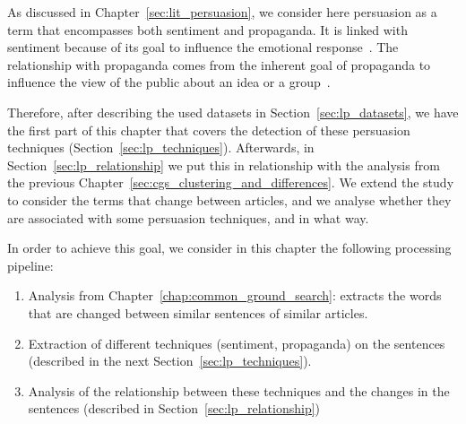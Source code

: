 As discussed in Chapter~\ref{sec:lit_persuasion}, we consider here \gls{persuasion} as a term that encompasses both \gls{sentiment} and \gls{propaganda}. %
It is linked with sentiment because of its goal to influence the emotional response~\citep{gatti2014sentiment,rocklage2018persuasion,petty2015emotion,desteno2004discrete}.
The relationship with propaganda comes from the inherent goal of propaganda to influence the view of the public about an idea or a group~\citep{bernays,jowett2018propaganda}.



Therefore, after describing the used datasets in Section~\ref{sec:lp_datasets}, we have the first part of this chapter that covers the detection of these persuasion techniques (Section~\ref{sec:lp_techniques}).
Afterwards, in Section~\ref{sec:lp_relationship} we put this in relationship with the analysis from the previous Chapter~\ref{sec:cgs_clustering_and_differences}. %
We extend the study to consider the terms that change between articles, and we analyse whether they are associated with some persuasion techniques, and in what way. %

In order to achieve this goal, we consider in this chapter the following processing pipeline:
\begin{enumerate}
    \item Analysis from Chapter~\ref{chap:common_ground_search}: extracts the words that are changed between similar sentences of similar articles.
    \item Extraction of different techniques (sentiment, propaganda) on the sentences (described in the next Section~\ref{sec:lp_techniques}). %
    \item Analysis of the relationship between these techniques and the changes in the sentences (described in Section~\ref{sec:lp_relationship})
\end{enumerate}


